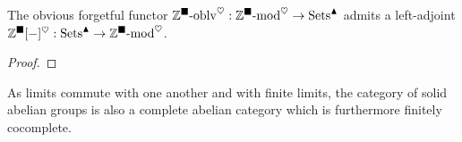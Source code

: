             \begin{proposition} \label{prop: free_solid_abelian_groups}
                The obvious forgetful functor $\mathbb{Z}^{\blacksquare}\text{-}\mathrm{oblv}^{\heartsuit}: \mathbb{Z}^{\blacksquare}\text{-}\mathrm{mod}^{\heartsuit} \to \mathrm{Sets}^{\blacktriangle}$ admits a left-adjoint $\mathbb{Z}^{\blacksquare}[-]^{\heartsuit}: \mathrm{Sets}^{\blacktriangle} \to \mathbb{Z}^{\blacksquare}\text{-}\mathrm{mod}^{\heartsuit}$. 
            \end{proposition}
                \begin{proof}
                    
                \end{proof}
            
            \begin{remark} \label{remark: the_abelian_category_of_solid_abelian_groups}
                As limits commute with one another and with finite limits, the category of solid abelian groups is also a complete abelian category which is furthermore finitely cocomplete.
            \end{remark}

    \printbibliography

